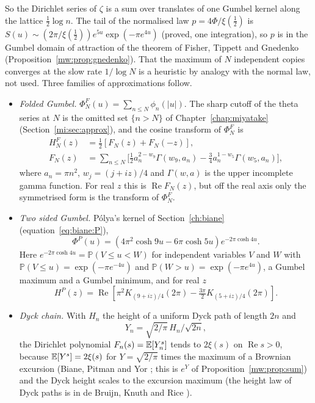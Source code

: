So the Dirichlet series of $\zeta$ is a sum over translates of one Gumbel kernel along the lattice $\tfrac12\log n$. The tail of the normalised law $p=4\Phi/\xi(\tfrac12)$ is $S(u)\sim(2\pi/\xi(\tfrac12))e^{5u}\exp(-\pi e^{4u})$ (proved, one integration), so $p$ is in the Gumbel domain of attraction of the theorem of Fisher, Tippett and Gnedenko (Proposition~\ref{mw:prop:gnedenko}). That the maximum of $N$ independent copies converges at the slow rate $1/\log N$ is a heuristic by analogy with the normal law, not used. Three families of approximations follow.

\begin{itemize}
\item \textit{Folded Gumbel.} $\Phi^F_N(u) = \sum_{n\le N}\phi_n(|u|)$. The sharp cutoff of the theta series at $N$ is the omitted set $\{n>N\}$ of Chapter~\ref{chap:miyatake} (Section~\ref{mi:sec:approx}), and the cosine transform of $\Phi^F_N$ is
\[\begin{aligned}H^F_N(z) &= \tfrac12\left[F_N(z)+F_N(-z)\right],\\ F_N(z)&=\sum_{n\le N}\Big[\tfrac12 a_n^{2-w_9}\Gamma(w_9,a_n) - \tfrac34 a_n^{1-w_5}\Gamma(w_5,a_n)\Big],\end{aligned}\]
where $a_n = \pi n^2$, $w_j = (j+iz)/4$ and $\Gamma(w,a)$ is the upper incomplete gamma function. For real $z$ this is $\operatorname{Re}F_N(z)$, but off the real axis only the symmetrised form is the transform of $\Phi^F_N$.
\item \textit{Two sided Gumbel.} P\'olya's kernel of Section~\ref{ch:biane} (equation~\eqref{eq:biane:P}),
\[\Phi^P(u) = (4\pi^2\cosh9u - 6\pi\cosh5u)e^{-2\pi\cosh4u}.\]
Here $e^{-2\pi\cosh4u}=\mathbb{P}(V\le u<W)$ for independent variables $V$ and $W$ with $\mathbb{P}(V\le u)=\exp(-\pi e^{-4u})$ and $\mathbb{P}(W>u)=\exp(-\pi e^{4u})$, a Gumbel maximum and a Gumbel minimum, and for real $z$
\[H^P(z) = \operatorname{Re}\left[\pi^2K_{(9+iz)/4}(2\pi) - \tfrac{3\pi}{2}K_{(5+iz)/4}(2\pi)\right].\]
\item \textit{Dyck chain.} With $H_n$ the height of a uniform Dyck path of length $2n$ and
\[Y_n = \sqrt{2/\pi}\,H_n/\sqrt{2n},\]
the Dirichlet polynomial $F_n(s) = \mathbb{E}[Y_n^s]$ tends to $2\xi(s)$ on $\operatorname{Re}s>0$, because $\mathbb{E}[Y^s] = 2\xi(s)$ for $Y=\sqrt{2/\pi}$ times the maximum of a Brownian excursion (Biane, Pitman and Yor \cite{BPY01}; this is $e^Y$ of Proposition~\ref{mw:prop:sum}) and the Dyck height scales to the excursion maximum (the height law of Dyck paths is in de Bruijn, Knuth and Rice \cite{deBruijnKnuthRice72}).
\end{itemize}

